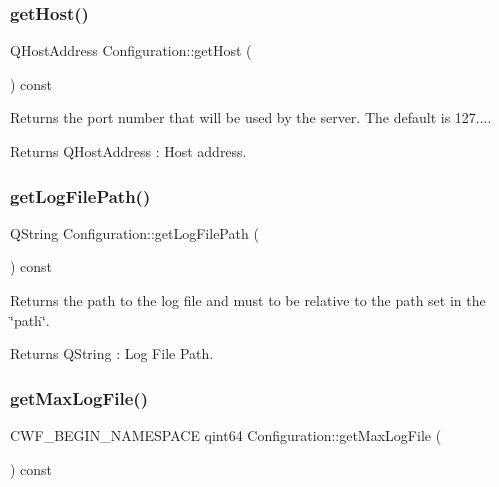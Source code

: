 \subsubsection{\texorpdfstring{get\+Host()}{getHost()}}
{\footnotesize\ttfamily Q\+Host\+Address Configuration\+::get\+Host (\begin{DoxyParamCaption}{ }\end{DoxyParamCaption}) const}



Returns the port number that will be used by the server. The default is 127.... 

\begin{DoxyReturn}{Returns}
Q\+Host\+Address \+: Host address. 
\end{DoxyReturn}
\mbox{\label{class_configuration_a005e1d10c605e08d73ff274f2b19fc48}} 
\subsubsection{\texorpdfstring{get\+Log\+File\+Path()}{getLogFilePath()}}
{\footnotesize\ttfamily Q\+String Configuration\+::get\+Log\+File\+Path (\begin{DoxyParamCaption}{ }\end{DoxyParamCaption}) const}



Returns the path to the log file and must to be relative to the path set in the \char`\"{}path\char`\"{}. 

\begin{DoxyReturn}{Returns}
Q\+String \+: Log File Path. 
\end{DoxyReturn}
\mbox{\label{class_configuration_a05ee88466fbe346175ec6420b6857b98}} 
\subsubsection{\texorpdfstring{get\+Max\+Log\+File()}{getMaxLogFile()}}
{\footnotesize\ttfamily C\+W\+F\+\_\+\+B\+E\+G\+I\+N\+\_\+\+N\+A\+M\+E\+S\+P\+A\+CE qint64 Configuration\+::get\+Max\+Log\+File (\begin{DoxyParamCaption}{ }\end{DoxyParamCaption}) const}



